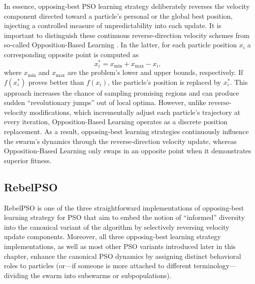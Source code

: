 {In essence, opposing‐best PSO learning strategy deliberately reverses the velocity component directed toward a particle's personal or the global best position, injecting a controlled measure of unpredictability into each update.
It is important to distinguish these continuous reverse‐direction velocity schemes from so-called Opposition‐Based Learning \citep[see, e.g.,][]{tizhoosh2005opposition,tizhoosh2006opposition,zhou2020improved}. In the latter, for each particle position $x_i$ a corresponding opposite point is computed as
\begin{equation}
    x_{i}^{*} = x_{\min} + x_{\max} - x_i,
\end{equation}
where $x_{\min}$ and $x_{\max}$ are the problem’s lower and upper bounds, respectively. If $f(x_{i}^{*})$ proves better than $f(x_i)$, the particle’s position is replaced by $x_{i}^{*}$. This approach increases the chance of sampling promising regions and can produce sudden ``revolutionary jumps'' out of local optima. However, unlike reverse-velocity modifications, which incrementally adjust each particle’s trajectory at every iteration, Op\-po\-si\-tion\-\mbox{-Based} Learning operates as a discrete position replacement. As a result, opposing-best learning strategies continuously influence the swarm's dynamics through the reverse\--di\-rec\-tion velocity update, whereas Opposition‐Based Learning only swaps in an opposite point when it demonstrates superior fitness.






\subsection*{RebelPSO}

RebelPSO is one of the three straightforward implementations of opposing-best learning strategy for PSO that aim to embed the notion of ``informed'' diversity into the canonical variant of the algorithm by selectively reversing velocity update components.
Moreover, all three opposing-best learning strategy implementations, as well as most other PSO variants introduced  later in this chapter, enhance the canonical PSO dynamics by assigning distinct behavioral roles to particles  (or---if someone is more attached to different terminology---dividing the swarm into subswarms or subpopulations).



}
